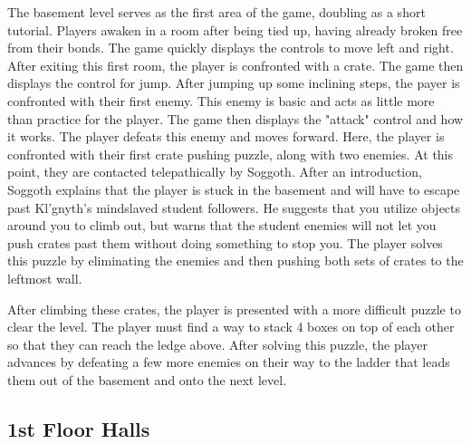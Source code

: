 \documentclass [12pt]{article}
\begin{document}
The basement level serves as the first area of the game, doubling as a short tutorial. Players awaken in a room after being tied up, having already broken free from their bonds. The game quickly displays the controls to move left and right. After exiting this first room, the player is confronted with a crate. The game then displays the control for jump. After jumping up some inclining steps, the payer is confronted with their first enemy. This enemy is basic and acts as little more than practice for the player. The game then displays the "attack" control and how it works. The player defeats this enemy and moves forward. Here, the player is confronted with their first crate pushing puzzle, along with two enemies. At this point, they are contacted telepathically by Soggoth. After an introduction, Soggoth explains that the player is stuck in the basement and will have to escape past Kl'gnyth's mindslaved student followers. He suggests that you utilize objects around you to climb out, but warns that the student enemies will not let you push crates past them without doing something to stop you. The player solves this puzzle by eliminating the enemies and then pushing both sets of crates to the leftmost wall.

After climbing these crates, the player is presented with a more difficult puzzle to clear the level. The player must find a way to stack 4 boxes on top of each other so that they can reach the ledge above. After solving this puzzle, the player advances by defeating a few more enemies on their way to the ladder that leads them out of the basement and onto the next level.

\subsection*{1st Floor Halls}
\end{document}
